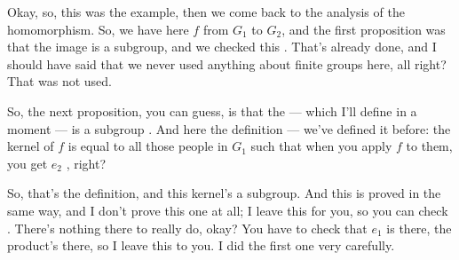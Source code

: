 \begin{speech}[00:25:43 - 00:27:01]
Okay, so, this was the example, then we come back to the analysis of the homomorphism. So, we have here $f$ from $G_1$ to $G_2$, and the first proposition was that the image is a subgroup, and we checked this . That's already done, and I should have said that we never used anything about finite groups here, all right? That was not used.

So, the next proposition, you can guess, is that the  --- which I'll define in a moment --- is a subgroup . And here the definition --- we've defined it before: the kernel of $f$ is equal to all those people in $G_1$ such that when you apply $f$ to them, you get $e_2$ , right?

So, that's the definition, and this kernel's a subgroup. And this is proved in the same way, and I don't prove this one at all; I leave this for you, so you can check . There's nothing there to really do, okay? You have to check that $e_1$ is there, the product's there, so I leave this to you. I did the first one very carefully.
\end{speech}

